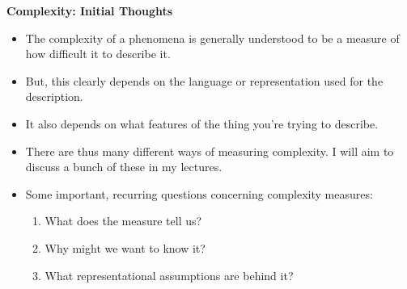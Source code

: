 \documentclass[%
  color,
  epsf,
  url,
  amssymb,
  semhelv,%
  portrait,%
  semlayer%
  ]{seminar}
\begin{document}
\begin{slide*}
\centerslidesfalse
\begin{center}
{\bf Complexity: Initial Thoughts}
\end{center}

\begin{itemize}

\item  The complexity of a phenomena is generally understood to be a
measure of how difficult it to describe it.

\item But, this clearly depends on the language or representation
used for the description.  

\item It also depends on what features of the thing you're trying to
describe.  

\item There are thus many different ways of measuring complexity.  I
will aim to discuss a bunch of these in my lectures. 

\item Some important, recurring questions concerning complexity
measures: 
\begin{enumerate}
   \item What does the measure tell us?
   \item Why might we want to know it?
   \item What representational assumptions are behind it?
\end{enumerate}

\end{itemize}

\end{slide*}

\end{document}
